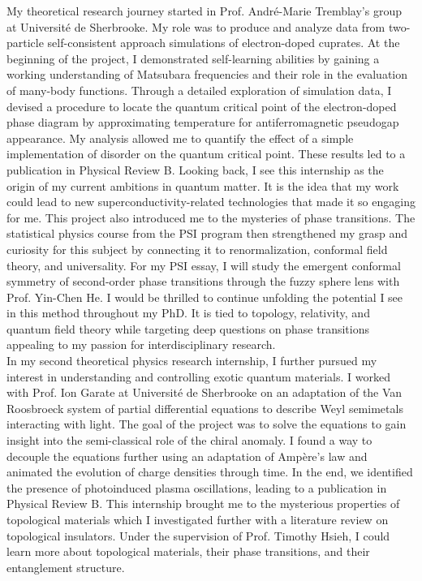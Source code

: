 \documentclass[12pt]{article}
\begin{document}
My theoretical research journey started in Prof. André-Marie Tremblay's group at Université de Sherbrooke. My role was to produce and analyze data from two-particle self-consistent approach simulations of electron-doped cuprates. At the beginning of the project, I demonstrated self-learning abilities by gaining a working understanding of Matsubara frequencies and their role in the evaluation of many-body functions. Through a detailed exploration of simulation data, I devised a procedure to locate the quantum critical point of the electron-doped phase diagram by approximating temperature for antiferromagnetic pseudogap appearance. My analysis allowed me to quantify the effect of a simple implementation of disorder on the quantum critical point. These results led to a publication in Physical Review B. Looking back, I see this internship as the origin of my current ambitions in quantum matter. It is the idea that my work could lead to new superconductivity-related technologies that made it so engaging for me. This project also introduced me to the mysteries of phase transitions. The statistical physics course from the PSI program then strengthened my grasp and curiosity for this subject by connecting it to renormalization, conformal field theory, and universality. For my PSI essay, I will study the emergent conformal symmetry of second-order phase transitions through the fuzzy sphere lens with Prof. Yin-Chen He. I would be thrilled to continue unfolding the potential I see in this method throughout my PhD. It is tied to topology, relativity, and quantum field theory while targeting deep questions on phase transitions appealing to my passion for interdisciplinary research.\\

In my second theoretical physics research internship, I further pursued my interest in understanding and controlling exotic quantum materials. I worked with Prof. Ion Garate at Université de Sherbrooke on an adaptation of the Van Roosbroeck system of partial differential equations to describe Weyl semimetals interacting with light. The goal of the project was to solve the equations to gain insight into the semi-classical role of the chiral anomaly. I found a way to decouple the equations further using an adaptation of Ampère's law and animated the evolution of charge densities through time. In the end, we identified the presence of photoinduced plasma oscillations, leading to a publication in Physical Review B. This internship brought me to the mysterious properties of topological materials which I investigated further with a literature review on topological insulators. Under the supervision of Prof. Timothy Hsieh, I could learn more about topological materials, their phase transitions, and their entanglement structure.\\
\end{document}
